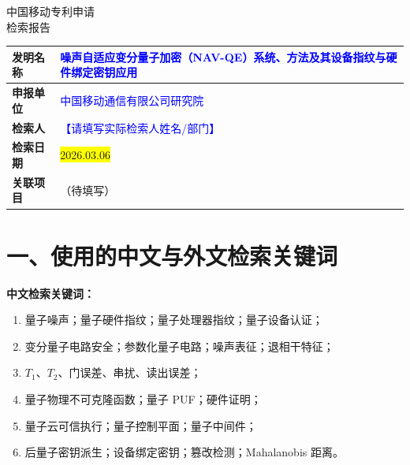 \documentclass[12pt,a4paper]{article}
\begin{document}
\noindent

\vspace{1em}

\begin{center}
    {\Huge\heiti 中国移动专利申请} \\[0.5em]
    {\Huge\heiti 检索报告} \\[1em]
\end{center}

\begin{table}[h]
    \centering
    \renewcommand{\arraystretch}{2}
    \begin{tabular}{|p{3cm}|p{12cm}|}
        \hline
        \textbf{发明名称} & \textcolor{blue}{噪声自适应变分量子加密（NAV-QE）系统、方法及其设备指纹与硬件绑定密钥应用} \\
        \hline
        \textbf{申报单位} & \textcolor{blue}{中国移动通信有限公司研究院} \\
        \hline
        \textbf{检索人} & \textcolor{blue}{【请填写实际检索人姓名/部门】} \\
        \hline
        \textbf{检索日期} & \colorbox{yellow}{2026.03.06} \\
        \hline
        \textbf{关联项目} & （待填写） \\
        \hline
    \end{tabular}
\end{table}

\vspace{0.5em}

\noindent{}

\vspace{1em}


\section*{一、使用的中文与外文检索关键词}

\textbf{中文检索关键词：}
\begin{enumerate}[leftmargin=2em]
    \item 量子噪声；量子硬件指纹；量子处理器指纹；量子设备认证；
    \item 变分量子电路安全；参数化量子电路；噪声表征；退相干特征；
    \item $T_1$、$T_2$、门误差、串扰、读出误差；
    \item 量子物理不可克隆函数；量子 PUF；硬件证明；
    \item 量子云可信执行；量子控制平面；量子中间件；
    \item 后量子密钥派生；设备绑定密钥；篡改检测；Mahalanobis 距离。
\end{enumerate}
\end{document}
